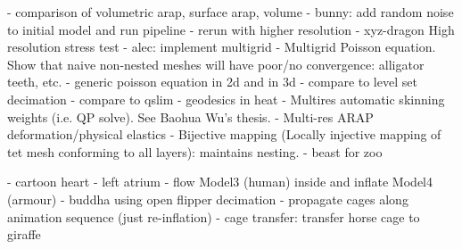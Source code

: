 - comparison of volumetric arap, surface arap, volume
- bunny: add random noise to initial model and run pipeline
  - rerun with higher resolution
- xyz-dragon High resolution stress test
- alec: implement multigrid
  - Multigrid Poisson equation. Show that naive non-nested meshes will have
    poor/no convergence: alligator teeth, etc.
      - generic poisson equation in 2d and in 3d
        - compare to level set decimation
        - compare to qslim
      - geodesics in heat 
  - Multires automatic skinning weights (i.e. QP solve). See Baohua Wu's thesis.
  - Multi-res ARAP deformation/physical elastics
  - Bijective mapping (Locally injective mapping of tet mesh conforming to all
    layers): maintains nesting.
- beast for zoo

- cartoon heart
- left atrium
- flow Model3 (human) inside and inflate Model4 (armour)
- buddha using open flipper decimation
- propagate cages along animation sequence (just re-inflation)
- cage transfer: transfer horse cage to giraffe

